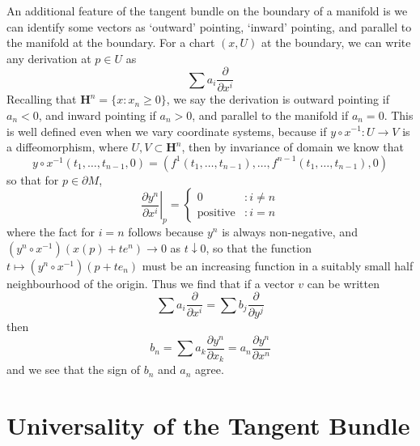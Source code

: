 An additional feature of the tangent bundle on the boundary of a manifold is we can identify some vectors as `outward' pointing, `inward' pointing, and parallel to the manifold at the boundary. For a chart $(x,U)$ at the boundary, we can write any derivation at $p \in U$ as
%
\[ \sum a_i \frac{\partial}{\partial x^i} \]
%
Recalling that $\mathbf{H}^n = \{ x: x_n \geq 0 \}$, we say the derivation is outward pointing if $a_n < 0$, and inward pointing if $a_n > 0$, and parallel to the manifold if $a_n = 0$. This is well defined even when we vary coordinate systems, because if $y \circ x^{-1}: U \to V$ is a diffeomorphism, where $U,V \subset \mathbf{H}^n$, then by invariance of domain we know that
%
\[ y \circ x^{-1}(t_1, \dots, t_{n-1}, 0) = (f^1(t_1, \dots, t_{n-1}), \dots, f^{n-1}(t_1, \dots, t_{n-1}), 0) \]
%
so that for $p \in \partial M$,
%
\[ \left.\frac{\partial y^n}{\partial x^i}\right|_p = \begin{cases} 0 &: i \neq n \\ \text{positive} &: i = n \end{cases} \]
%
where the fact for $i = n$ follows because $y^n$ is always non-negative, and $(y^n \circ x^{-1})(x(p) + te^n) \to 0$ as $t \downarrow 0$, so that the function $t \mapsto (y^n \circ x^{-1})(p + te_n)$ must be an increasing function in a suitably small half neighbourhood of the origin. Thus we find that if a vector $v$ can be written
%
\[ \sum a_i \frac{\partial}{\partial x^i} = \sum b_j \frac{\partial}{\partial y^j} \]
%
then
%
\[ b_n = \sum a_k \frac{\partial y^n}{\partial x_k} = a_n \frac{\partial y^n}{\partial x^n} \]
%
and we see that the sign of $b_n$ and $a_n$ agree.

\section{Universality of the Tangent Bundle}

